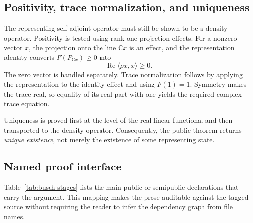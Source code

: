\documentclass[pdflatex,sn-mathphys-num]{sn-jnl}
\theoremstyle{thmstyleone}
\theoremstyle{thmstylethree}
\begin{document}
\subsection{Positivity, trace normalization, and uniqueness}\label{positivity-trace-normalization-and-uniqueness}

The representing self-adjoint operator must still be shown to be a density operator. Positivity is tested using rank-one projection effects. For a nonzero vector \(x\), the projection onto the line \(\mathbb Cx\) is an effect, and the representation identity converts \(F(P_{\mathbb Cx})\geq0\) into \[\operatorname{Re}\langle \rho x,x\rangle\geq0.\] The zero vector is handled separately. Trace normalization follows by applying the representation to the identity effect and using \(F(1)=1\). Symmetry makes the trace real, so equality of its real part with one yields the required complex trace equation.

Uniqueness is proved first at the level of the real-linear functional and then transported to the density operator. Consequently, the public theorem returns \emph{unique existence}, not merely the existence of some representing state.

\subsection{Named proof interface}\label{named-proof-interface}

Table~\ref{tab:busch-stages} lists the main public or semipublic declarations that carry the argument. This mapping makes the prose auditable against the tagged source without requiring the reader to infer the dependency graph from file names.
\end{document}
